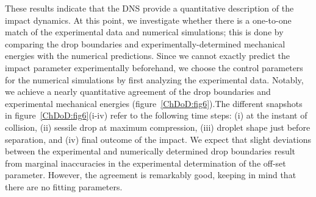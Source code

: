 These results indicate that the DNS provide a quantitative description of the impact dynamics. At this point, we investigate whether there is a one-to-one match of the experimental data and numerical simulations; this is done by comparing the drop boundaries and experimentally-determined mechanical energies with the numerical predictions. Since we cannot exactly predict the impact parameter experimentally beforehand, we choose the control parameters for the numerical simulations by first analyzing the experimental data. Notably, we achieve a nearly quantitative agreement of the drop boundaries and experimental mechanical energies (figure~\ref{ChDoD:fig6}).The different snapshots in figure~\ref{ChDoD:fig6}(i-iv) refer to the following time steps: (i) at the instant of collision, (ii) sessile drop at maximum compression, (iii) droplet shape just before separation, and (iv) final outcome of the impact. We expect that slight deviations between the experimental and numerically determined drop boundaries result from marginal inaccuracies in the experimental determination of the off-set parameter. However, the agreement is remarkably good, keeping in mind that there are no fitting parameters. 

